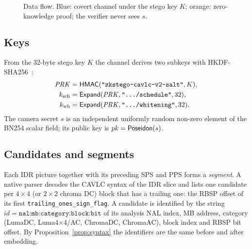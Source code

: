 \begin{figure}[t]
\caption{Data flow. Blue: covert channel under the stego key $K$; orange: zero-knowledge proof; the verifier never sees $s$.}
\label{fig:overview}
\end{figure}

\subsection{Keys}
From the 32-byte stego key $K$ the channel derives two subkeys with HKDF-SHA256~\cite{rfc5869}:
\begin{align}
\mathit{PRK}&=\mathsf{HMAC}(\texttt{"zkstego-cavlc-v2-salt"},K),\\
k_{\mathrm{sch}}&=\mathsf{Expand}(\mathit{PRK},\texttt{".../schedule"},32),\\
k_{\mathrm{wh}}&=\mathsf{Expand}(\mathit{PRK},\texttt{".../whitening"},32).
\end{align}
The camera secret $s$ is an independent uniformly random non-zero element of the BN254 scalar field; its public key is $pk=\mathsf{Poseidon}(s)$.

\subsection{Candidates and segments}
Each IDR picture together with its preceding SPS and PPS forms a \emph{segment}. A native parser decodes the CAVLC syntax of the IDR slice and lists one candidate per $4\times4$ (or $2\times2$ chroma DC) block that has a trailing one: the RBSP offset of its first \texttt{trailing\_ones\_sign\_flag}. A candidate is identified by the string $\mathit{id}=\texttt{nal:mb:category:block:bit}$ of its analysis NAL index, MB address, category (LumaDC, Luma4$\times$4/AC, ChromaDC, ChromaAC), block index and RBSP bit offset. By Proposition~\ref{prop:syntax} the identifiers are the same before and after embedding.

